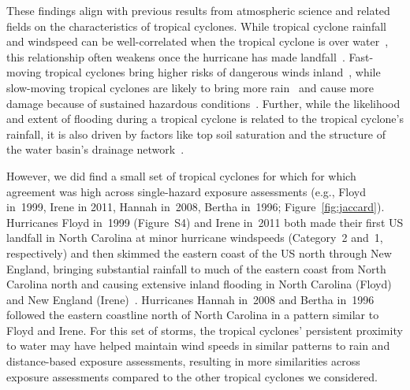 These findings align with previous results from atmospheric science and related
fields on the characteristics of tropical cyclones. While tropical cyclone
rainfall and windspeed can be well-correlated when the tropical cyclone is
over water~\parencite{cerveny2000}, this relationship often weakens once the
hurricane has made landfall~\parencite{jiang2008}.  Fast-moving tropical
cyclones bring higher risks of dangerous winds inland~\parencite{kruk2010},
while slow-moving tropical cyclones are likely to bring more
rain~\parencite{rappaport2000} and cause more damage because of sustained
hazardous conditions~\parencite{rezapour2014}. Further, while the likelihood
and extent of flooding during a tropical cyclone is related to the tropical
cyclone's rainfall, it is also driven by factors like top soil saturation and
the structure of the water basin's drainage network~\parencite{chen2015,
rees2001}. 

However, we did find a small set of tropical cyclones for which for which
agreement was high across single-hazard exposure assessments (e.g., Floyd
in~1999, Irene in 2011, Hannah in~2008, Bertha in~1996;
Figure~\ref{fig:jaccard}).  Hurricanes Floyd in~1999 (Figure~S4) and Irene
in~2011 both made their first \ac{US} landfall in North Carolina at minor
hurricane windspeeds (Category~2 and~1, respectively) and then skimmed the
eastern coast of the \ac{US} north through New England, bringing substantial
rainfall to much of the eastern coast from North Carolina north and causing
extensive inland flooding in North Carolina (Floyd) and New England
(Irene)~\parencite{avila2013atlantic, lawrence2000atlantic}.  Hurricanes Hannah
in~2008 and Bertha in~1996 followed the eastern coastline north of North
Carolina in a pattern similar to Floyd and Irene. For this set of storms, the
tropical cyclones' persistent proximity to water may have helped maintain wind
speeds in similar patterns to rain and distance-based exposure assessments,
resulting in more similarities across exposure assessments compared to the
other tropical cyclones we considered. 

